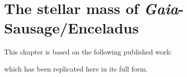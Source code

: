 \chapter{The stellar mass of \textit{Gaia}-Sausage/Enceladus}

This chapter is based on the following published work:

\vspace{10pt}
\vspace{10pt}

\noindent which has been replicated here in its full form.


